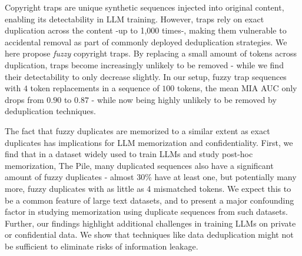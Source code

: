 
Copyright traps are unique synthetic sequences injected into original content, enabling its detectability in LLM training. However, traps rely on exact duplication across the content -up to 1,000 times-, making them vulnerable to accidental removal as part of commonly deployed deduplication strategies. We here propose \emph{fuzzy} copyright traps. By replacing a small amount of tokens across duplication, traps become increasingly unlikely to be removed - while we find their detectability to only decrease slightly. In our setup, fuzzy trap sequences with $4$ token replacements in a sequence of $100$ tokens, the mean MIA AUC only drops from $0.90$ to $0.87$ - while now being highly unlikely to be removed by deduplication techniques. 

The fact that fuzzy duplicates are memorized to a similar extent as exact duplicates has implications for LLM memorization and confidentiality. First, we find that in a dataset widely used to train LLMs and study post-hoc memorization, The Pile, many duplicated sequences also have a significant amount of fuzzy duplicates - almost 30\% have at least one, but potentially many more, fuzzy duplicates with as little as 4 mismatched tokens.
We expect this to be a common feature of large text datasets, and to present a major confounding factor in studying memorization using duplicate sequences from such datasets.
Further, our findings highlight additional challenges in training LLMs on private or confidential data. We show that techniques like data deduplication might not be sufficient to eliminate risks of information leakage.